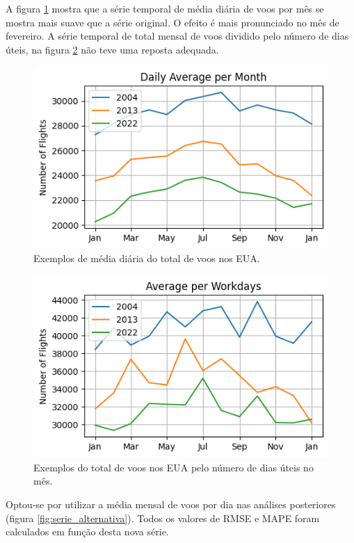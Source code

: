 \documentclass[final,5p]{elsarticle}
\numberwithin{equation}{section}
\begin{document}
    A figura \ref{fig:exemplo_media} mostra que a série temporal de média diária de voos por mês se mostra mais suave que a série original. O efeito é mais pronunciado no mês de fevereiro. A série temporal de total mensal de voos dividido pelo número de dias úteis, na figura \ref{fig:exemplo_dais_uteis} não teve uma reposta adequada.

    \begin{figure}[hbt!]
        \includegraphics[width=0.95\columnwidth]{A_Daily_Average_per_Month.png}
        \caption{Exemplos de média diária do total de voos nos EUA.}
        \label{fig:exemplo_media}
    \end{figure}

    \begin{figure}[hbt!]
        \includegraphics[width=0.95\columnwidth]{A_Average_per_Workdays.png}
        \caption{Exemplos do total de voos nos EUA pelo número de dias úteis no mês.}
        \label{fig:exemplo_dais_uteis}
    \end{figure}

    Optou-se por utilizar a média mensal de voos por dia nas análises posteriores (figura \ref{fig:serie_alternativa}). Todos os valores de RMSE e MAPE foram calculados em função desta nova série.
\end{document}

